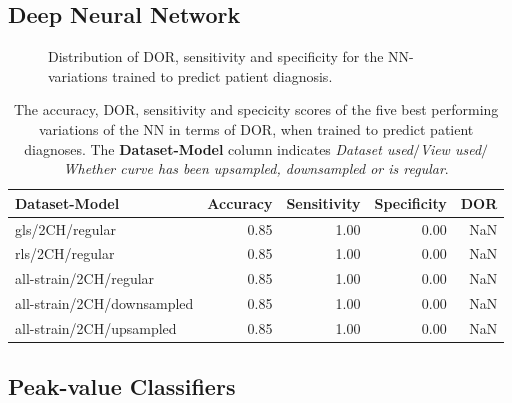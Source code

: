 \newpage

\subsection{Deep Neural Network}

\begin{figure}[htb]
    \centering
    
    \caption{Distribution of DOR, sensitivity and specificity for the NN-variations trained to predict patient diagnosis.}
    \label{fig:dl_ind_dor_sens_spec_dist}
\end{figure}

\begin{table}
    \centering
    \begin{tabular}{lrrrr}
        \toprule
        Dataset-Model              &  Accuracy &  Sensitivity &  Specificity &  DOR \\
        \midrule
        gls/2CH/regular            &      0.85 &         1.00 &         0.00 &  NaN \\
        rls/2CH/regular            &      0.85 &         1.00 &         0.00 &  NaN \\
        all-strain/2CH/regular     &      0.85 &         1.00 &         0.00 &  NaN \\
        all-strain/2CH/downsampled &      0.85 &         1.00 &         0.00 &  NaN \\
        all-strain/2CH/upsampled   &      0.85 &         1.00 &         0.00 &  NaN \\
        \bottomrule
    \end{tabular}
    \caption{The accuracy, DOR, sensitivity and specicity scores of the five best performing variations of the NN in terms of DOR, when trained to predict patient diagnoses.
             The \textbf{Dataset-Model} column indicates \textit{Dataset used}$/$\textit{View used}$/$\textit{Whether curve has been upsampled, downsampled or is regular}.}
    \label{tab:dl_hf_dor_sens_spec_dist}
\end{table}

\newpage

\subsection{Peak-value Classifiers}

